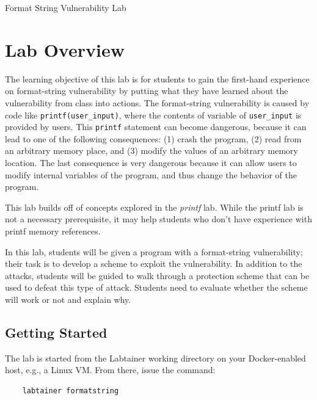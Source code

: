 







\begin{center}
{\LARGE Format String Vulnerability Lab}
\end{center}

\copyrightnotice


\section{Lab Overview}

The learning objective of this lab is for students to gain the first-hand
experience on format-string vulnerability by putting what they have learned 
about the vulnerability from class into actions.
The format-string vulnerability is caused by code like 
{\tt printf(user\_input)}, where the contents of variable
of {\tt user\_input} is provided by users. 
This {\tt printf}
statement can become dangerous, because it can lead to one of the following
consequences: (1) crash the 
program, (2) read from an arbitrary memory place, and (3) modify
the values of an arbitrary memory location. The last consequence
is very dangerous because it can allow users to modify internal
variables of the program, and thus change the behavior
of the program.  

This lab builds off of concepts explored in the \textit{printf} lab.  While
the printf lab is not a necessary prerequisite, it may help students who
don't have experience with printf memory references.

In this lab, students will be given a program with a format-string
vulnerability; their task is to develop a scheme to exploit
the vulnerability.  In addition to the
attacks, students will be guided to walk through a protection
scheme that can be used to defeat this type of attack. 
Students need to evaluate
whether the scheme will work or not and explain why.


\subsection{Getting Started}
The lab is started from the Labtainer working 
directory on your Docker-enabled host, e.g., a Linux VM.
From there, issue the command:
\begin{verbatim}
    labtainer formatstring
\end{verbatim}

